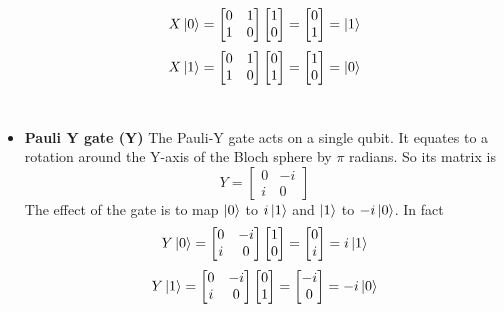 \documentclass[main.tex]{subfiles}
\theoremstyle{definition}
\begin{document}
\begin{itemize}
	$$
	X\ket{0}=
	\begin{bmatrix}
	0 & 1\\
	1 & 0
	\end{bmatrix}
	\begin{bmatrix}
	1 \\
	0
	\end{bmatrix}
	=
	\begin{bmatrix}
	0 \\
	1
	\end{bmatrix}
	=\ket{1}
	$$
	$$
	X\ket{1}=
	\begin{bmatrix}
	0 & 1\\
	1 & 0
	\end{bmatrix}
	\begin{bmatrix}
	0 \\
	1
	\end{bmatrix}
	=
	\begin{bmatrix}
	1 \\
	0
	\end{bmatrix}
	=\ket{0}
	$$\\
	
	\item \textbf{Pauli Y gate (Y)} The Pauli-Y gate acts on a single qubit. It equates to a rotation around the Y-axis of the Bloch sphere by $\pi$ radians. So its matrix is 
	\begin{equation}
	Y=
	\begin{bmatrix}
	0 & -i\\
	i & 0
	\end{bmatrix}
	\end{equation}
	The effect of the gate is to map
	$\ket{0}$ to $i\ket{1}$ and 
	$\ket{1}$ to $-i\ket{0}$. In fact
	$$
	Y\ket{0}=
	\begin{bmatrix}
	0 & -i\\
	i & 0
	\end{bmatrix}
	\begin{bmatrix}
	1 \\
	0
	\end{bmatrix}
	=
		\begin{bmatrix}
	0 \\
	i
	\end{bmatrix}
	=
	i\ket{1}
	$$
	$$
	Y\ket{1}=
	\begin{bmatrix}
	0 & -i\\
	i & 0
	\end{bmatrix}
	\begin{bmatrix}
	0 \\
	1
	\end{bmatrix}
	=
		\begin{bmatrix}
	-i \\
	0
	\end{bmatrix}
	=
	-i\ket{0}
	$$\\
	

\end{itemize}
\end{document}
